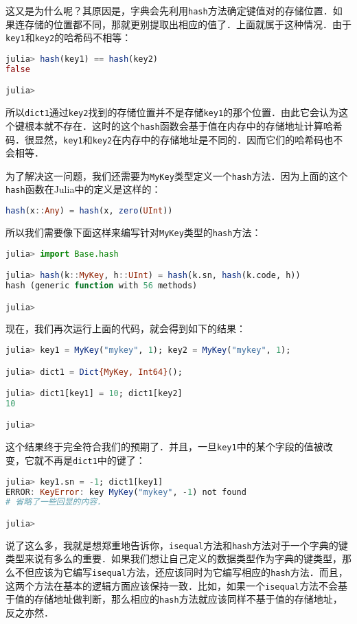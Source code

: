这又是为什么呢？其原因是，字典会先利用\verb|hash|方法确定键值对的存储位置．如果连存储的位置都不同，那就更别提取出相应的值了．上面就属于这种情况．由于\verb|key1|和\verb|key2|的哈希码不相等：
\begin{lstlisting}[language=julia]
julia> hash(key1) == hash(key2)
false

julia> 
\end{lstlisting}

所以\verb|dict1|通过\verb|key2|找到的存储位置并不是存储\verb|key1|的那个位置．由此它会认为这个键根本就不存在．这时的这个\verb|hash|函数会基于值在内存中的存储地址计算哈希码．很显然，\verb|key1|和\verb|key2|在内存中的存储地址是不同的．因而它们的哈希码也不会相等．

为了解决这一问题，我们还需要为\verb|MyKey|类型定义一个\verb|hash|方法．因为上面的这个\verb|hash|函数在Julia中的定义是这样的：
\begin{lstlisting}[language=julia]
hash(x::Any) = hash(x, zero(UInt))
\end{lstlisting}

所以我们需要像下面这样来编写针对\verb|MyKey|类型的\verb|hash|方法：
\begin{lstlisting}[language=julia]
julia> import Base.hash

julia> hash(k::MyKey, h::UInt) = hash(k.sn, hash(k.code, h))
hash (generic function with 56 methods)

julia> 
\end{lstlisting}

现在，我们再次运行上面的代码，就会得到如下的结果：
\begin{lstlisting}[language=julia]
julia> key1 = MyKey("mykey", 1); key2 = MyKey("mykey", 1);

julia> dict1 = Dict{MyKey, Int64}(); 

julia> dict1[key1] = 10; dict1[key2]
10

julia> 
\end{lstlisting}

这个结果终于完全符合我们的预期了．并且，一旦\verb|key1|中的某个字段的值被改变，它就不再是\verb|dict1|中的键了：
\begin{lstlisting}[language=julia]
julia> key1.sn = -1; dict1[key1]
ERROR: KeyError: key MyKey("mykey", -1) not found
# 省略了一些回显的内容．

julia> 
\end{lstlisting}

说了这么多，我就是想郑重地告诉你，\verb|isequal|方法和\verb|hash|方法对于一个字典的键类型来说有多么的重要．如果我们想让自己定义的数据类型作为字典的键类型，那么不但应该为它编写\verb|isequal|方法，还应该同时为它编写相应的\verb|hash|方法．而且，这两个方法在基本的逻辑方面应该保持一致．比如，如果一个\verb|isequal|方法不会基于值的存储地址做判断，那么相应的\verb|hash|方法就应该同样不基于值的存储地址，反之亦然．

